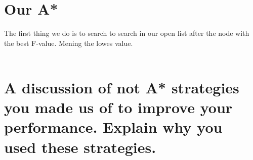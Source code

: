 \documentclass[12pt, a4paper]{article}
\begin{document}
\section{Our A*}
The first thing we do is to search to search in our open list after the node with the best F-value. Mening the lowes value.\\\\





\section{A discussion of not A* strategies you made us of to improve your performance. Explain why you used these strategies.}
\end{document}
